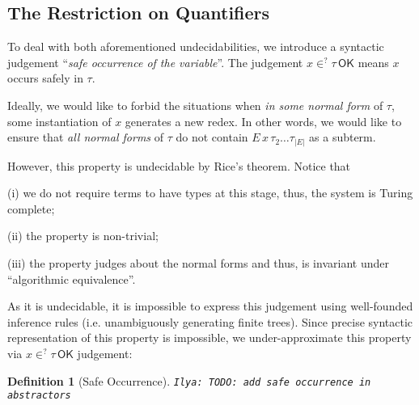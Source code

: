 \documentclass[a4,natbib=false]{article}
\newtheorem{definition}{Definition}
\newcommand{\ilyam}[1]{{\color{red} \texttt{Ilya:  #1}}}
\newcommand{\narg}[1]{|{#1}|}
\newcommand{\judgeSinert}[1]{{#1}\,\mathsf{INERT}}
\newcommand{\judgeSok}[2]{{#1} \in^{?} {#2}\,\mathsf{OK}}
\newcommand{\fv}[1]{\mathsf{FV}(#1)}
\newcommand{\fullterm}[2]{{#1}\,#2_1 \dots #2_{\narg{#1}}}
\newcommand{\Infer}[3]{\inferrule*[right={#1}]{#2}{#3}}
\begin{document}
\subsection{The Restriction on Quantifiers}

To deal with both aforementioned undecidabilities, we introduce a syntactic 
judgement ``\emph{safe occurrence of the variable}''. The judgement $\judgeSok{x}{\tau}$ means $x$
occurs safely in $\tau$.

Ideally, we would like to forbid the situations when \emph{in some normal form}
of $\tau$, some instantiation of $x$ generates a new redex. In other words, we
would like to ensure that
\emph{all normal forms} of $\tau$ do not contain $E \, x \, \tau_2 \dots
\tau_{\narg{E}}$ as a subterm.

However, this property is undecidable by Rice's theorem. Notice that
\begin{enumerate*}

\item[(i)] we do not require terms to have types at this stage, thus, the
  system is Turing complete;

\item[(ii)] the property is non-trivial;

\item[(iii)] the property judges about the normal forms and thus, is invariant
  under ``algorithmic equivalence''.
\end{enumerate*}

As it is undecidable, it is impossible to express this judgement using
well-founded inference rules (i.e. unambiguously generating finite trees).
Since precise syntactic representation of this property is impossible, we
under-approximate this property via $\judgeSok{x}{\tau}$ judgement:


\begin{definition}[Safe Occurrence]

\ilyam{TODO: add safe occurrence in abstractors}

\end{definition}
\end{document}
